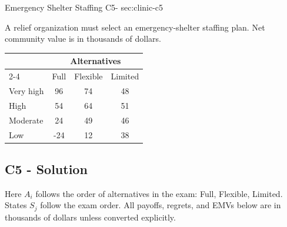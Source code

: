 \sectionScored
	{Emergency Shelter Staffing}
	{C5-}
	{sec:clinic-c5}
	{
	A relief organization must select an emergency-shelter staffing plan. Net community value is in thousands of dollars.
		\begin{center}
			\setlength{\tabcolsep}{2pt}
			\renewcommand{\arraystretch}{1.1}
			\begin{tabular}{lccc}
				\toprule
				& \multicolumn{3}{c}{Alternatives} \\
				\cmidrule(lr){2-4}
				& Full & Flexible & Limited \\ \midrule
				Very high & 96 & 74 & 48 \\
				High      & 54 & 64 & 51 \\
				Moderate  & 24 & 49 & 46 \\
				Low       & -24 & 12 & 38 \\ \bottomrule
			\end{tabular}
		\end{center}


	\label{subsec:clinic-c5-solution}
	\subsection*{C5 - Solution }

	Here $A_i$ follows the order of alternatives in the exam: Full, Flexible, Limited. States $S_j$ follow the exam order. All payoffs, regrets, and EMVs below are in thousands of dollars unless converted explicitly.

}
